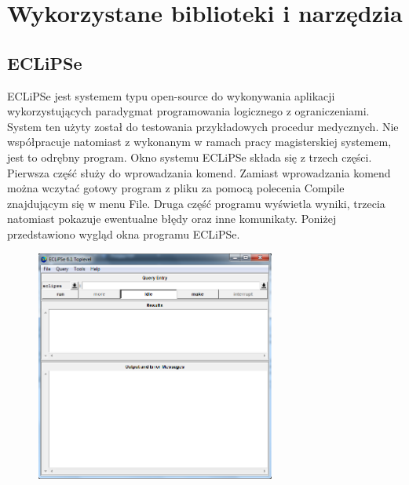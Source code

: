 \chapter{Wykorzystane biblioteki i narzędzia}

\section{ECLiPSe}

ECLiPSe\cite{EclipseSite} jest systemem typu open-source do wykonywania aplikacji wykorzystujących paradygmat programowania logicznego z ograniczeniami. System ten użyty został do testowania przykładowych procedur medycznych. 
Nie współpracuje natomiast z wykonanym w ramach pracy magisterskiej systemem, jest to odrębny program. 
Okno systemu ECLiPSe składa się z trzech części. Pierwsza część służy do wprowadzania komend. Zamiast wprowadzania komend można wczytać gotowy program z pliku za pomocą polecenia Compile znajdującym się w menu File. Druga część programu wyświetla wyniki, trzecia natomiast pokazuje ewentualne błędy oraz inne komunikaty. Poniżej przedstawiono wygląd okna programu ECLiPSe.
\begin{figure}[H]
\centering
\includegraphics[width=0.7\textwidth]{img/okno.png}
\end{figure}


